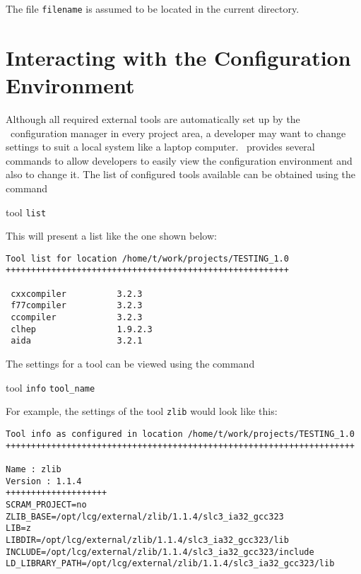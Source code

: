 \ni The file \texttt{filename} is assumed to be located in the current directory.

\section{Interacting with the Configuration Environment}\label{sec:configurationtools}
Although all required external tools are automatically set up by the
\scram\ configuration manager in every project area, a developer may
want to change settings to suit a local system like a laptop computer.
\scram\ provides several commands to allow developers to easily view
the configuration environment and also to change it. The list of
configured tools available can be obtained using the command

\begin{scramcmd}{tool}
  \texttt{list}
\end{scramcmd}

\ni This will present a list like the one shown below: \footnotesize{
\begin{verbatim}
Tool list for location /home/t/work/projects/TESTING_1.0
++++++++++++++++++++++++++++++++++++++++++++++++++++++++

 cxxcompiler          3.2.3     
 f77compiler          3.2.3     
 ccompiler            3.2.3     
 clhep                1.9.2.3   
 aida                 3.2.1

\end{verbatim}
}\normalsize

\ni The settings for a tool can be viewed using the command

\begin{scramcmd}{tool}
  \texttt{info} \texttt{tool\_name}
\end{scramcmd}

\ni For example, the settings of the tool \texttt{zlib} would look like
this: \small{
\begin{verbatim}
Tool info as configured in location /home/t/work/projects/TESTING_1.0
+++++++++++++++++++++++++++++++++++++++++++++++++++++++++++++++++++++

Name : zlib
Version : 1.1.4
++++++++++++++++++++
SCRAM_PROJECT=no
ZLIB_BASE=/opt/lcg/external/zlib/1.1.4/slc3_ia32_gcc323
LIB=z
LIBDIR=/opt/lcg/external/zlib/1.1.4/slc3_ia32_gcc323/lib
INCLUDE=/opt/lcg/external/zlib/1.1.4/slc3_ia32_gcc323/include
LD_LIBRARY_PATH=/opt/lcg/external/zlib/1.1.4/slc3_ia32_gcc323/lib
\end{verbatim}
}\normalsize

